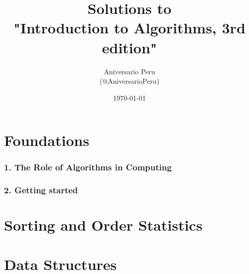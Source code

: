 \documentclass[11pt]{article}
\title{Solutions to\\"Introduction to Algorithms, 3rd edition"}
\author{Aniversario Peru\\(@AniversarioPeru)}
\date{\today}
\begin{document}
\maketitle



\part{Foundations}

\section{1. The Role of Algorithms in Computing}


\section{2. Getting started}




\part{Sorting and Order Statistics}

\part{Data Structures}


\listoffigures
\listoftables
\end{document}
